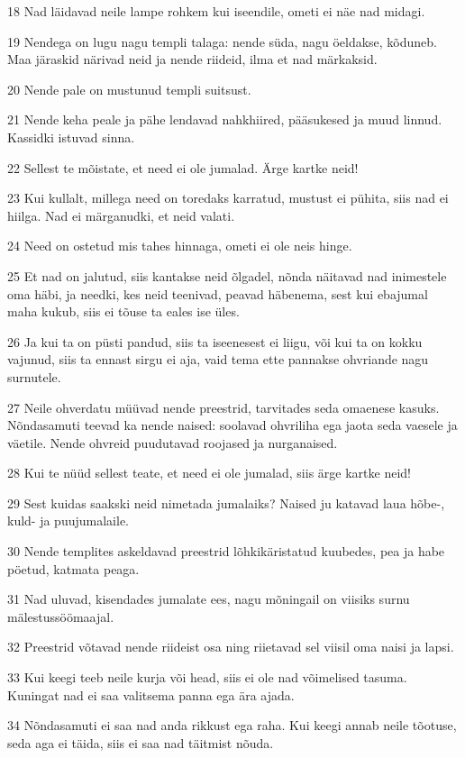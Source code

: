\par 18 Nad läidavad neile lampe rohkem kui iseendile, ometi ei näe  nad midagi.
\par 19 Nendega on lugu nagu templi talaga: nende süda, nagu öeldakse,  kõduneb. Maa järaskid närivad neid ja nende riideid, ilma et nad  märkaksid.
\par 20 Nende pale on mustunud templi suitsust.
\par 21 Nende keha peale ja pähe lendavad nahkhiired, pääsukesed ja muud  linnud. Kassidki istuvad sinna.
\par 22 Sellest te mõistate, et need ei ole jumalad. Ärge kartke neid!
\par 23 Kui kullalt, millega need on toredaks karratud, mustust ei  pühita, siis nad ei hiilga. Nad ei märganudki, et neid valati.
\par 24 Need on ostetud mis tahes hinnaga, ometi ei ole neis hinge.
\par 25 Et nad on jalutud, siis kantakse neid õlgadel, nõnda näitavad  nad  inimestele oma häbi, ja needki, kes neid teenivad, peavad häbenema,  sest kui ebajumal maha kukub, siis ei tõuse ta eales ise üles.
\par 26 Ja kui ta on püsti pandud, siis ta iseenesest ei liigu, või kui  ta on kokku vajunud, siis ta ennast sirgu ei aja, vaid tema ette pannakse  ohvriande nagu surnutele.
\par 27 Neile ohverdatu müüvad nende preestrid, tarvitades seda omaenese  kasuks. Nõndasamuti teevad ka nende naised: soolavad ohvriliha ega  jaota seda vaesele ja väetile. Nende ohvreid puudutavad roojased ja  nurganaised.
\par 28 Kui te nüüd sellest teate, et need ei ole jumalad, siis ärge  kartke neid!
\par 29 Sest kuidas saakski neid nimetada jumalaiks? Naised ju katavad  laua hõbe-, kuld- ja puujumalaile.
\par 30 Nende templites askeldavad preestrid lõhkikäristatud  kuubedes, pea ja habe pöetud, katmata peaga.
\par 31 Nad uluvad, kisendades jumalate ees, nagu mõningail on viisiks  surnu mälestussöömaajal.
\par 32 Preestrid võtavad nende riideist osa ning riietavad sel  viisil oma naisi ja lapsi.
\par 33 Kui keegi teeb neile kurja või head, siis ei ole nad võimelised  tasuma. Kuningat nad ei saa valitsema panna ega ära ajada.
\par 34 Nõndasamuti ei saa nad anda rikkust ega raha. Kui keegi annab  neile tõotuse, seda aga ei täida, siis ei saa nad täitmist nõuda.
